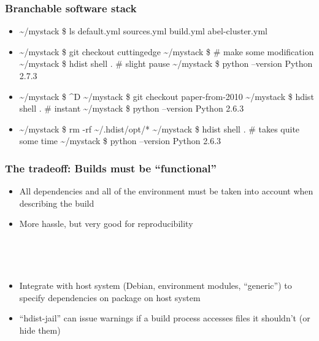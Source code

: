 \documentclass[sans,mathserif]{beamer}
\begin{document}
\begin{frame}[fragile]
\frametitle{Branchable software stack}

\begin{itemize}
\item<+->
\begin{semiverbatim}
\textasciitilde{}/mystack \$ ls
default.yml sources.yml build.yml abel-cluster.yml
\end{semiverbatim}

\item<+->
\begin{semiverbatim}
\textasciitilde{}/mystack \$ git checkout cuttingedge
\textasciitilde{}/mystack \$ # make some modification
\textasciitilde{}/mystack \$ hdist shell . # slight pause
\textasciitilde{}/mystack \$ python --version
Python 2.7.3
\end{semiverbatim}

\item<+->
\begin{semiverbatim}
\textasciitilde{}/mystack \$ \^{}D
\textasciitilde{}/mystack \$ git checkout paper-from-2010
\textasciitilde{}/mystack \$ hdist shell . # instant
\textasciitilde{}/mystack \$ python --version
Python 2.6.3
\end{semiverbatim}

\item<+->
\begin{semiverbatim}
\textasciitilde{}/mystack \$ rm -rf \textasciitilde{}/.hdist/opt/*
\textasciitilde{}/mystack \$ hdist shell . # takes quite some time
\textasciitilde{}/mystack \$ python --version
Python 2.6.3
\end{semiverbatim}
\end{itemize}


\end{frame}


\begin{frame}
  \frametitle{The tradeoff: Builds must be ``functional''}

  \begin{itemize}
  \item<+-> All dependencies and all of the environment must be
    taken into account when describing the build
  \item<+-> More hassle, but very good for reproducibility
  \end{itemize}

~
 

~

\begin{itemize}
\item<+-> Integrate with host system (Debian, environment modules,
  ``generic'') to specify dependencies on package on host system
\item<+-> ``hdist-jail'' can issue warnings if a build process
  accesses files it shouldn't (or hide them)

\end{itemize}

\end{frame}
\end{document}
